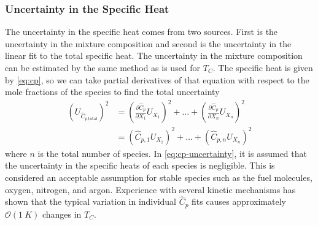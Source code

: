\documentclass[12pt, letterpaper]{article}
\begin{document}
\subsubsection{Uncertainty in the Specific Heat}
\label{sec:unc-cp}

The uncertainty in the specific heat comes from two sources. First is the
uncertainty in the mixture composition and second is the uncertainty in
the linear fit to the total specific heat. The uncertainty in the mixture
composition can be estimated by the same method as is used for $T_C$. The
specific heat is given by \autoref{eq:cp}, so we can take partial derivatives
of that equation with respect to the mole fractions of the species to find
the total uncertainty
%
\begin{equation}
\label{eq:cp-uncertainty}
\begin{split}
\left(U_{\hat{C}_{p\text{,total}}}\right)^2 &= \left(\frac{\partial \hat{C}_p}{\partial X_1} U_{X_1}\right)^2 + \ldots + \left(\frac{\partial \hat{C}_p}{\partial X_n} U_{X_n}\right)^2 \\
&= \left(\hat{C}_{p,1} U_{X_1}\right)^2 + \ldots + \left(\hat{C}_{p,n} U_{X_n}\right)^2
\end{split}
\end{equation}
%
where $n$ is the total number of species. In \autoref{eq:cp-uncertainty},
it is assumed that the uncertainty in the specific heats of each species
is negligible. This is considered an acceptable assumption for stable species
such as the fuel molecules, oxygen, nitrogen, and argon. Experience with
several kinetic mechanisms has shown that the typical variation in individual
$\hat{C}_p$ fits causes approximately $\mathcal{O}(\SI{1}{K})$ changes in $T_C$.
\end{document}
